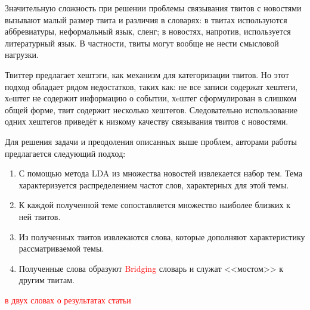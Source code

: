         Значительную сложность при решении проблемы связывания твитов с новостями вызывают малый размер твита и различия в словарях: в твитах используются аббревиатуры,
        неформальный язык, сленг; в новостях, напротив, используется литературный язык.
        В частности, твиты могут вообще не нести смысловой нагрузки.

        Твиттер предлагает хештэги, как механизм для категоризации твитов.
        Но этот подход обладает рядом недостатков, таких как: не все записи содержат хештеги, хeштег не содержит информацию о событии, хeштег сформулирован в слишком общей форме,
        твит содержит несколько хештегов.
        Следовательно использование одних хештегов приведёт к низкому качеству связывания твитов с новостями.

         Для решения задачи и преодоления описанных выше проблем, авторами работы предлагается следующий подход:
         \begin{enumerate}
            \item С помощью метода LDA из множества новостей извлекается набор тем. Тема характеризуется распределением частот слов, характерных для этой темы.
            \item К каждой полученной теме сопоставляется множество наиболее близких к ней твитов.
            \item Из полученных твитов извлекаются слова, которые дополняют характеристику рассматриваемой темы.
            \item Полученные слова образуют \textcolor{red}{Bridging} словарь и служат <<мостом>> к другим твитам.
         \end{enumerate}

         \textcolor{red}{в двух словах о результатах статьи}
